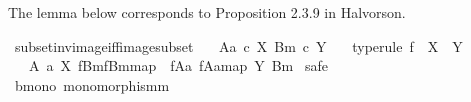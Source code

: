 \begin{isabellebody}
\isamarkupfalse%
%
\endisatagproof
{\isafoldproof}%
%
\isadelimproof
%
\endisadelimproof
%
\begin{isamarkuptext}%
The lemma below corresponds to Proposition 2.3.9 in Halvorson.%
\end{isamarkuptext}\isamarkuptrue%
\isamarkupfalse%
\ subset{\isacharunderscore}{\kern0pt}inv{\isacharunderscore}{\kern0pt}image{\isacharunderscore}{\kern0pt}iff{\isacharunderscore}{\kern0pt}image{\isacharunderscore}{\kern0pt}subset{\isacharcolon}{\kern0pt}\isanewline
\ \ \ {\isachardoublequoteopen}{\isacharparenleft}{\kern0pt}A{\isacharcomma}{\kern0pt}a{\isacharparenright}{\kern0pt}\ {\isasymsubseteq}\isactrlsub c\ X{\isachardoublequoteclose}\ {\isachardoublequoteopen}{\isacharparenleft}{\kern0pt}B{\isacharcomma}{\kern0pt}m{\isacharparenright}{\kern0pt}\ {\isasymsubseteq}\isactrlsub c\ Y{\isachardoublequoteclose}\ \isanewline
\ \ type{\isacharunderscore}{\kern0pt}rule{\isacharbrackright}{\kern0pt}{\isacharcolon}{\kern0pt}\ {\isachardoublequoteopen}f\ {\isacharcolon}{\kern0pt}\ X\ {\isasymrightarrow}\ Y{\isachardoublequoteclose}\isanewline
\ \ \ {\isachardoublequoteopen}{\isacharparenleft}{\kern0pt}{\isacharparenleft}{\kern0pt}A{\isacharcomma}{\kern0pt}\ a{\isacharparenright}{\kern0pt}\ {\isasymsubseteq}\isactrlbsub X\isactrlesub \ {\isacharparenleft}{\kern0pt}f\isactrlsup {\isacharminus}{\kern0pt}B{\isasymrparr}\isactrlbsub m\isactrlesub {\isacharcomma}{\kern0pt}{\isacharbrackleft}{\kern0pt}f\isactrlsup {\isacharminus}{\kern0pt}B{\isasymrparr}\isactrlbsub m\isactrlesub {\isacharbrackright}{\kern0pt}map{\isacharparenright}{\kern0pt}{\isacharparenright}{\kern0pt}\ {\isacharequal}{\kern0pt}\ {\isacharparenleft}{\kern0pt}{\isacharparenleft}{\kern0pt}f{\isasymlparr}A{\isasymrparr}\isactrlbsub a\isactrlesub {\isacharcomma}{\kern0pt}\ {\isacharbrackleft}{\kern0pt}f{\isasymlparr}A{\isasymrparr}\isactrlbsub a\isactrlesub {\isacharbrackright}{\kern0pt}map{\isacharparenright}{\kern0pt}\ {\isasymsubseteq}\isactrlbsub Y\isactrlesub \ {\isacharparenleft}{\kern0pt}B{\isacharcomma}{\kern0pt}m{\isacharparenright}{\kern0pt}{\isacharparenright}{\kern0pt}{\isachardoublequoteclose}\isanewline
%
\isadelimproof
%
\endisadelimproof
%
\isatagproof
{}\isamarkupfalse%
\ safe\isanewline
\ \ \isamarkupfalse%
\ b{\isacharunderscore}{\kern0pt}mono{\isacharcolon}{\kern0pt}\ {\isachardoublequoteopen}monomorphism{\isacharparenleft}{\kern0pt}m{\isacharparenright}{\kern0pt}{\isachardoublequoteclose}\isanewline

\end{isabellebody}
